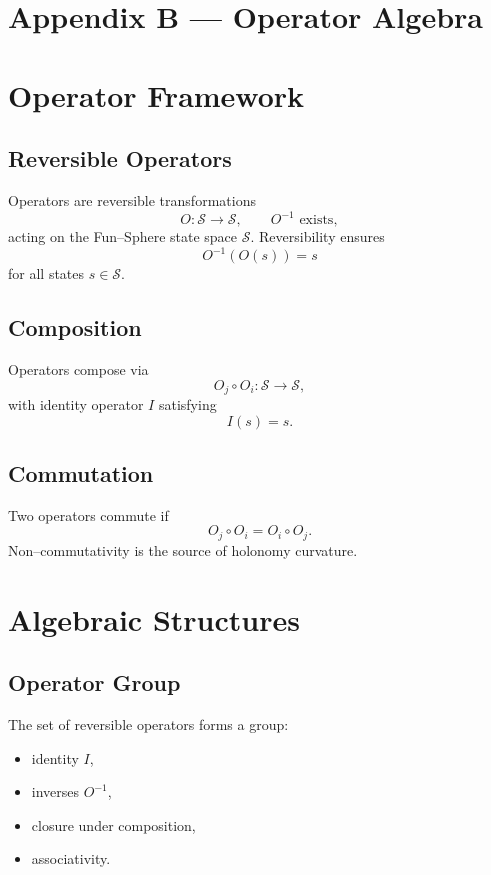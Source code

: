 \appendix
\section*{Appendix B — Operator Algebra}

\section{Operator Framework}

\subsection{Reversible Operators}
Operators are reversible transformations
\[
O : \mathcal{S} \rightarrow \mathcal{S},
\qquad
O^{-1} \text{ exists},
\]
acting on the Fun–Sphere state space $\mathcal{S}$. Reversibility ensures
\[
O^{-1}(O(s)) = s
\]
for all states $s \in \mathcal{S}$.

\subsection{Composition}
Operators compose via
\[
O_j \circ O_i : \mathcal{S} \rightarrow \mathcal{S},
\]
with identity operator $I$ satisfying
\[
I(s) = s.
\]

\subsection{Commutation}
Two operators commute if
\[
O_j \circ O_i = O_i \circ O_j.
\]
Non–commutativity is the source of holonomy curvature.

\section{Algebraic Structures}

\subsection{Operator Group}
The set of reversible operators forms a group:
\begin{itemize}
    \item identity $I$,
    \item inverses $O^{-1}$,
    \item closure under composition,
    \item associativity.
\end{itemize}

